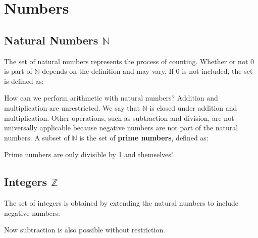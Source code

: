 \chapter{Numbers}\label{Numbers}

\section{Natural Numbers $\mathbb{N}$}\label{Natural Numbers}
The set of natural numbers represents the process of counting. Whether or not 0 is part of $\mathbb{N}$ depends on the definition and may vary. If 0 is not included, the set is defined as:


How can we perform arithmetic with natural numbers? Addition and multiplication are unrestricted. We say that $\mathbb{N}$ is closed under addition and multiplication. Other operations, such as subtraction and division, are not universally applicable because negative numbers are not part of the natural numbers. A subset of $\mathbb{N}$ is the set of \textbf{prime numbers}, defined as:


Prime numbers are only divisible by 1 and themselves!

\section{Integers $\mathbb{Z}$}\label{Integers}
The set of integers is obtained by extending the natural numbers to include negative numbers:


Now subtraction is also possible without restriction.

